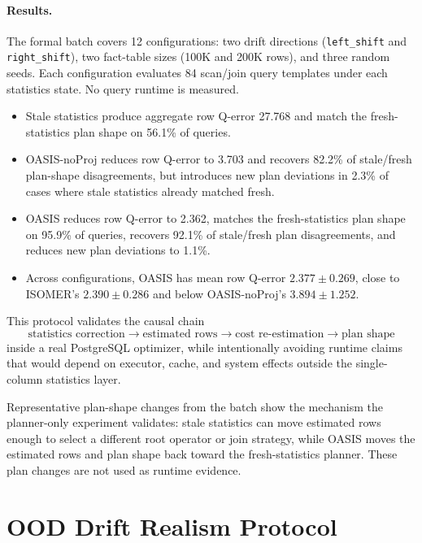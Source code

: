 \documentclass[11pt]{article}
\begin{document}
\paragraph{Results.}
The formal batch covers 12 configurations: two drift directions
(\texttt{left\_shift} and \texttt{right\_shift}), two fact-table sizes
(100K and 200K rows), and three random seeds. Each configuration evaluates
84 scan/join query templates under each statistics state. No query runtime is
measured.

\begin{itemize}
  \item Stale statistics produce aggregate row Q-error 27.768 and match the
        fresh-statistics plan shape on 56.1\% of queries.
  \item OASIS-noProj reduces row Q-error to 3.703 and recovers 82.2\% of
        stale/fresh plan-shape disagreements, but introduces new plan
        deviations in 2.3\% of cases where stale statistics already matched
        fresh.
  \item OASIS reduces row Q-error to 2.362, matches the fresh-statistics
        plan shape on 95.9\% of queries, recovers 92.1\% of stale/fresh plan
        disagreements, and reduces new plan deviations to 1.1\%.
  \item Across configurations, OASIS has mean row Q-error
        $2.377\pm0.269$, close to ISOMER's $2.390\pm0.286$ and below
        OASIS-noProj's $3.894\pm1.252$.
\end{itemize}

This protocol validates the causal chain
\[
  \text{statistics correction} \rightarrow \text{estimated rows}
  \rightarrow \text{cost re-estimation} \rightarrow \text{plan shape}
\]
inside a real PostgreSQL optimizer, while intentionally avoiding runtime
claims that would depend on executor, cache, and system effects outside the
single-column statistics layer.

Representative plan-shape changes from the batch show the mechanism the planner-only
experiment validates: stale statistics can move estimated rows enough to select a
different root operator or join strategy, while OASIS moves the estimated rows and plan
shape back toward the fresh-statistics planner. These plan changes are not used as runtime
evidence.

\section{OOD Drift Realism Protocol}
\label{sec:ood-drift-app}
\end{document}
